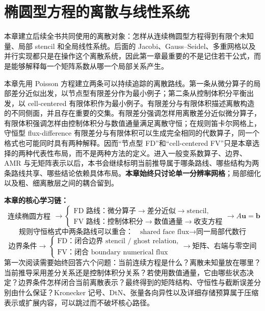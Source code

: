 \chapter{椭圆型方程的离散与线性系统}
\label{ch:discretization}

本章建立后续全书共同使用的离散对象：怎样从连续椭圆型方程得到有限个未知量、局部 stencil 和全局线性系统。后面的 Jacobi、Gauss--Seidel、多重网格以及并行实现都只是在操作这个离散系统，因此第一章最重要的不是记住若干公式，而是能够解释每一个矩阵系数从哪一个局部关系产生。

本章先用 Poisson 方程建立两条可以持续追踪的离散路线。第一条从微分算子的局部差分近似出发，以节点型有限差分作为最小例子；第二条从控制体积分平衡出发，以 cell-centered 有限体积作为最小例子。有限差分与有限体积描述离散构造的不同侧面，并且存在重要的交集。有限差分强调怎样用离散差分近似微分算子，有限体积强调怎样由控制体积分与数值通量满足离散守恒；在规则笛卡尔网格上，守恒型 flux-difference 有限差分与有限体积可以生成完全相同的代数算子，同一个格式也可能同时具有两种解释。因而“节点型 FD”和“cell-centered FV”只是本章选择的两种代表性布局，而不是两种方法的定义。进入一般变系数算子、边界、AMR 与无矩阵表示以后，本书会继续标明当前推导属于哪条路线、哪些结构为两条路线共享、哪些结论依赖具体布局。\textbf{本章始终只讨论单一分辨率网格}；局部细化以及粗、细离散层之间的耦合留到。

\begin{keybox}
\textbf{本章的核心学习链：}
\[
\boxed{
\begin{array}{c}
\text{连续椭圆方程}
\end{array}
\longrightarrow
\begin{cases}
\text{FD 路线：微分算子}\rightarrow\text{差分近似}\rightarrow\text{stencil},\\
\text{FV 路线：控制体积分}\rightarrow\text{数值通量}\rightarrow\text{收支方程}
\end{cases}
\longrightarrow A\bm u=\bm b}
\]
\[
\boxed{
\text{规则守恒格式中两条路线可以重合：}
\quad
\text{shared face flux}\rightarrow\text{同一局部代数行}}
\]
\[
\boxed{
\text{边界条件}
\rightarrow
\begin{cases}
\text{FD：闭合边界 stencil / ghost relation},\\
\text{FV：闭合 boundary numerical flux}
\end{cases}
\rightarrow\text{矩阵、右端与零空间}}
\]
第一次阅读需要始终回答六个问题：当前连续方程是什么？离散未知量放在哪里？当前推导采用差分关系还是控制体积分关系？若使用数值通量，它由哪些状态决定？边界条件怎样闭合当前离散表示？最终得到的矩阵结构、守恒性与截断误差分别由什么保证？Kronecker 记号、DtN、张量各向异性以及详细存储预算属于压缩表示或扩展内容，可以跳过而不破坏核心路径。
\end{keybox}

